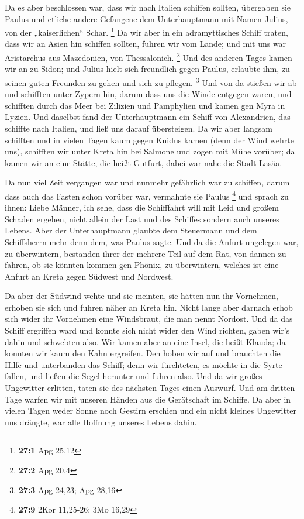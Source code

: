  Da es aber beschlossen war, dass wir nach Italien schiffen
sollten, übergaben sie Paulus und etliche andere Gefangene dem
Unterhauptmann mit Namen Julius, von der „kaiserlichen`` Schar.
\footnote{\textbf{27:1} Apg 25,12}  Da wir aber in ein
adramyttisches Schiff traten, dass wir an Asien hin schiffen sollten,
fuhren wir vom Lande; und mit uns war Aristarchus aus Mazedonien, von
Thessalonich. \footnote{\textbf{27:2} Apg 20,4}  Und des
anderen Tages kamen wir an zu Sidon; und Julius hielt sich freundlich
gegen Paulus, erlaubte ihm, zu seinen guten Freunden zu gehen und sich
zu pflegen. \footnote{\textbf{27:3} Apg 24,23; Apg 28,16} 
Und von da stießen wir ab und schifften unter Zypern hin, darum dass uns
die Winde entgegen waren,  und schifften durch das Meer bei
Zilizien und Pamphylien und kamen gen Myra in Lyzien.  Und
daselbst fand der Unterhauptmann ein Schiff von Alexandrien, das
schiffte nach Italien, und ließ uns darauf übersteigen.  Da
wir aber langsam schifften und in vielen Tagen kaum gegen Knidus kamen
(denn der Wind wehrte uns), schifften wir unter Kreta hin bei Salmone
 und zogen mit Mühe vorüber; da kamen wir an eine Stätte,
die heißt Gutfurt, dabei war nahe die Stadt Lasäa.

 Da nun viel Zeit vergangen war und nunmehr gefährlich war
zu schiffen, darum dass auch das Fasten schon vorüber war, vermahnte sie
Paulus \footnote{\textbf{27:9} 2Kor 11,25-26; 3Mo 16,29} 
und sprach zu ihnen: Liebe Männer, ich sehe, dass die Schifffahrt will
mit Leid und großem Schaden ergehen, nicht allein der Last und des
Schiffes sondern auch unseres Lebens.  Aber der
Unterhauptmann glaubte dem Steuermann und dem Schiffsherrn mehr denn
dem, was Paulus sagte.  Und da die Anfurt ungelegen war, zu
überwintern, bestanden ihrer der mehrere Teil auf dem Rat, von dannen zu
fahren, ob sie könnten kommen gen Phönix, zu überwintern, welches ist
eine Anfurt an Kreta gegen Südwest und Nordwest.

 Da aber der Südwind wehte und sie meinten, sie hätten nun
ihr Vornehmen, erhoben sie sich und fuhren näher an Kreta hin.
 Nicht lange aber darnach erhob sich wider ihr Vornehmen
eine Windsbraut, die man nennt Nordost.  Und da das Schiff
ergriffen ward und konnte sich nicht wider den Wind richten, gaben wir's
dahin und schwebten also.  Wir kamen aber an eine Insel,
die heißt Klauda; da konnten wir kaum den Kahn ergreifen. 
Den hoben wir auf und brauchten die Hilfe und unterbanden das Schiff;
denn wir fürchteten, es möchte in die Syrte fallen, und ließen die Segel
herunter und fuhren also.  Und da wir großes Ungewitter
erlitten, taten sie des nächsten Tages einen Auswurf.  Und
am dritten Tage warfen wir mit unseren Händen aus die Gerätschaft im
Schiffe.  Da aber in vielen Tagen weder Sonne noch Gestirn
erschien und ein nicht kleines Ungewitter uns drängte, war alle Hoffnung
unseres Lebens dahin.

